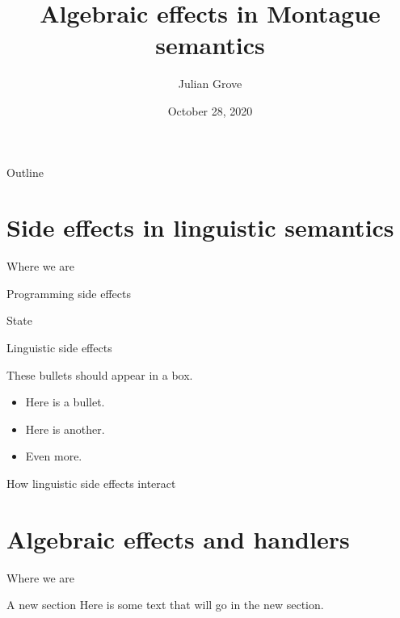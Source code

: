 \documentclass[presentation]{beamer}
\author{Julian Grove}
\date{October 28, 2020}
\title{Algebraic effects in Montague semantics}
\institute[CLASP, U. of Gothenburg]{CLASP, University of Gothenburg}
\begin{document}
\maketitle
\begin{frame}{Outline}
\tableofcontents
\end{frame}


\section{Side effects in linguistic semantics}
\label{sec:org2b2f357}

\begin{frame}[label={sec:orgdd5848b}]{Where we are}
\tableofcontents[currentsection]
\end{frame}

\begin{frame}[label={sec:org29383bb}]{Programming side effects}
\begin{block}{State}
\end{block}
\end{frame}

\begin{frame}[label={sec:orgffad39c}]{Linguistic side effects}
\begin{block}{These bullets should appear in a box.}
\begin{itemize}
\item Here is a bullet.
\item Here is another.
\item Even more.
\end{itemize}
\end{block}
\end{frame}

\begin{frame}[label={sec:org920686a}]{How linguistic side effects interact}
\end{frame}

\section{Algebraic effects and handlers}
\label{sec:org56af4a7}

\begin{frame}[label={sec:org064d8d1}]{Where we are}
\tableofcontents[currentsection]
\end{frame}

\begin{frame}[label={sec:org343c96c}]{A new section}
Here is some text that will go in the new section.
\end{frame}
\end{document}
